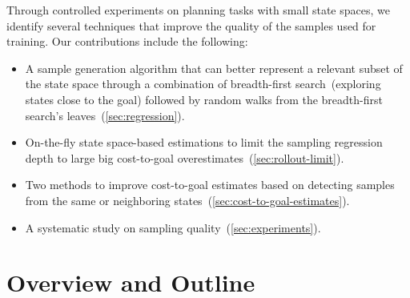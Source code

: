 Through controlled experiments on planning tasks with small state spaces, we identify several techniques that improve the quality of the samples used for training. Our contributions include the following:

\begin{itemize}
    \item A sample generation algorithm that can better represent a relevant subset of the state space through a combination of breadth-first search~(exploring states close to the goal) followed by random walks from the breadth-first search's leaves~(\cref{sec:regression}).
    \item On-the-fly state space-based estimations to limit the sampling regression depth to large big cost-to-goal overestimates~(\cref{sec:rollout-limit}).
    \item Two methods to improve cost-to-goal estimates based on detecting samples from the same or neighboring states~(\cref{sec:cost-to-goal-estimates}).
    \item A systematic study on sampling quality~(\cref{sec:experiments}).
\end{itemize}

\section{Overview and Outline}
\label{sec:outline}

